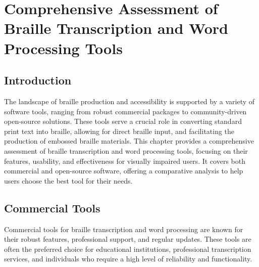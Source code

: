 \chapter{Comprehensive Assessment of Braille Transcription and Word Processing Tools}\label{ch12:braille-transcription}


\section{Introduction}\label{ch12:sec:introduction}
The landscape of braille production and accessibility is supported by a variety of software tools, ranging from robust commercial packages to community-driven open-source solutions. These tools serve a crucial role in converting standard print text into braille, allowing for direct braille input, and facilitating the production of embossed braille materials. This chapter provides a comprehensive assessment of braille transcription and word processing tools, focusing on their features, usability, and effectiveness for visually impaired users. It covers both commercial and open-source software, offering a comparative analysis to help users choose the best tool for their needs.

\section{Commercial Tools}\label{ch12:sec:commercial-tools}
Commercial tools for braille transcription and word processing are known for their robust features, professional support, and regular updates. These tools are often the preferred choice for educational institutions, professional transcription services, and individuals who require a high level of reliability and functionality.

